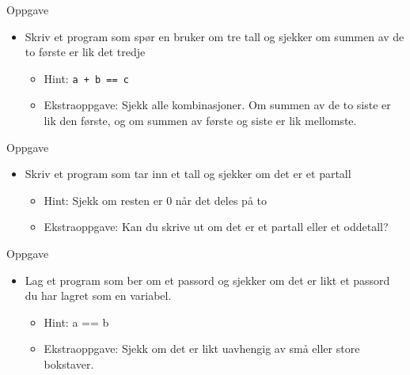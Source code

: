 \documentclass[screen, aspectratio=169]{beamer}
\begin{document}
\begin{frame}{Oppgave}
	\begin{itemize}
		\item Skriv et program som spør en bruker om tre tall og sjekker om summen av de to første er lik det tredje
			\begin{itemize}
			\item<2-> Hint: \lstinline|a + b == c|
			\item<2-> Ekstraoppgave: Sjekk alle kombinasjoner. Om summen av de to siste er lik den første, og om summen av første og siste er lik mellomste. 
		\end{itemize}
	\end{itemize}
\end{frame}

\begin{frame}{Oppgave}
	\begin{itemize}
		\item Skriv et program som tar inn et tall og sjekker om det er et partall
		\begin{itemize}
			\item<2-> Hint: Sjekk om resten er 0 når det deles på to
			\item<2-> Ekstraoppgave: Kan du skrive ut om det er et partall eller et oddetall? 
		\end{itemize}
	\end{itemize}
\end{frame}

\begin{frame}{Oppgave}
	\begin{itemize}
		\item Lag et program som ber om et passord og sjekker om det er likt et passord du har lagret som en variabel.
				\begin{itemize}
			\item<2-> Hint: a == b
			\item<2-> Ekstraoppgave: Sjekk om det er likt uavhengig av små eller store bokstaver. 
		\end{itemize}
	\end{itemize}
\end{frame}
\end{document}
